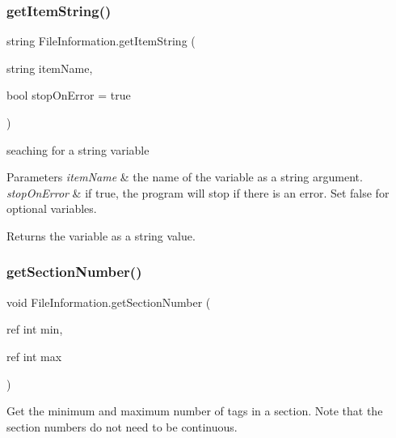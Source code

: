 \subsubsection{\texorpdfstring{getItemString()}{getItemString()}\hspace{0.1cm}{\footnotesize\ttfamily [2/2]}}
{\footnotesize\ttfamily string File\+Information.\+get\+Item\+String (\begin{DoxyParamCaption}\item[{string}]{item\+Name,  }\item[{bool}]{stop\+On\+Error = {\ttfamily true} }\end{DoxyParamCaption})\hspace{0.3cm}{\ttfamily [inline]}}



seaching for a string variable 


\begin{DoxyParams}{Parameters}
{\em item\+Name} & the name of the variable as a string argument. \\
\hline
{\em stop\+On\+Error} & if true, the program will stop if there is an error. Set false for optional variables. \\
\hline
\end{DoxyParams}
\begin{DoxyReturn}{Returns}
the variable as a string value. 
\end{DoxyReturn}
\mbox{\label{class_file_information_ae8fbc8bfb8316ca12118e69040172ac5}} 
\subsubsection{\texorpdfstring{getSectionNumber()}{getSectionNumber()}}
{\footnotesize\ttfamily void File\+Information.\+get\+Section\+Number (\begin{DoxyParamCaption}\item[{ref int}]{min,  }\item[{ref int}]{max }\end{DoxyParamCaption})\hspace{0.3cm}{\ttfamily [inline]}}



Get the minimum and maximum number of tags in a section. Note that the section numbers do not need to be continuous. 


